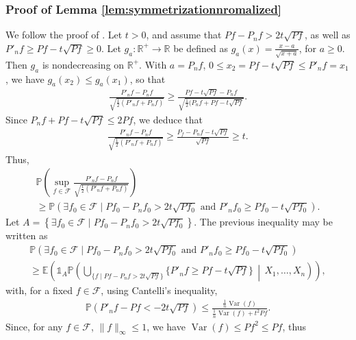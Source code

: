\documentclass[noinfoline,preprint]{article}
\renewcommand{\1}{\mathds 1}
\newcommand{\Var}{\operatorname{Var}}
\begin{document}
\subsubsection{Proof of Lemma \ref{lem:symmetrizationnromalized}}\label{sec:proof_lem_symmetrization_normalized}
We follow the proof of \cite[Theorem 1]{Bartlett99}. Let $t >0$, and assume that $Pf - P_nf > 2t \sqrt{Pf}$, as well as $P'_nf \geq Pf - t \sqrt{Pf} \geq 0$. Let $g_a: \mathbb{R}^+ \rightarrow \mathbb{R}$ be defined as $g_a(x) = \frac{x-a}{\sqrt{x+a}}$, for $a \geq 0$. Then $g_a$ is nondecreasing on $\mathbb{R}^+$. With $a = P_nf$, $0 \leq x_2 = Pf - t \sqrt{Pf} \leq P'_nf = x_1$, we have $g_a(x_2) \leq g_a(x_1)$, so that
\begin{align*}
\frac{P'_nf - P_nf}{\sqrt{\frac{1}{2}(P'_nf + P_nf)}} \geq \frac{Pf - t \sqrt{Pf} - P_nf}{\sqrt{\frac{1}{2}(P_nf + Pf - t \sqrt{Pf}}}.
\end{align*} 
Since $P_nf + Pf - t \sqrt{Pf} \leq 2 Pf$, we deduce that
\begin{align*}
\frac{P'_nf - P_nf}{\sqrt{\frac{1}{2} \left ( P'_nf + P_nf \right )}} \geq \frac{P_f - P_nf - t \sqrt{Pf}}{\sqrt{Pf}} \geq t.
\end{align*}
Thus, 
\begin{multline*}
\mathbb{P} \left ( \sup_{f \in \mathcal{F}} \frac{P'_nf - P_nf}{\sqrt{\frac{1}{2} \left ( P'_nf + P_nf \right )}} \right ) \\
\geq \mathbb{P} \left ( \exists f_0 \in \mathcal{F} \mid Pf_0 - P_n f_0 > 2t \sqrt{Pf_0} \mbox{ and } P'_nf_0 \geq Pf_0 - t \sqrt{Pf_0} \right ).
\end{multline*}
Let $A = \left \{ \exists f_0 \in \mathcal{F} \mid Pf_0 - P_n f_0 > 2t \sqrt{Pf_0} \right \}$. The previous inequality may be written as
\begin{multline*}
\mathbb{P} \left ( \exists f_0 \in \mathcal{F} \mid Pf_0 - P_n f_0 > 2t \sqrt{Pf_0} \mbox{ and } P'_nf_0 \geq Pf_0 - t \sqrt{Pf_0} \right ) \\
\geq \mathbb{E} \left ( \mathds{1}_A \mathbb{P} \left ( \bigcup_{\{f \mid Pf - P_n f > 2t \sqrt{Pf} \}} \{P'_nf \geq Pf - t \sqrt{Pf}\} \,\middle|\, X_1, \hdots, X_n \right ) \right ),
\end{multline*}
with, for a fixed $f \in \mathcal{F}$, using Cantelli's inequality,
\begin{align*}
\mathbb{P} \left ( P'_nf - Pf < -2t \sqrt{Pf} \right ) \leq \frac{\frac{1}{n} \Var(f)}{\frac{1}{n}\Var(f) + t^2 Pf}.
\end{align*}
Since, for any $f \in \mathcal{F}$, $\|f\|_\infty \leq 1$, we have $\Var(f) \leq Pf^2 \leq Pf$, thus
\end{document}
